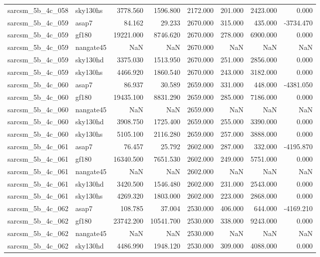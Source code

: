 \begin{tabular}{llrrrrrr}
sarcsm\_5b\_4c\_058 & sky130hs & 3778.560 & 1596.800 & 2172.000 & 201.000 & 2423.000 & 0.000 \\
sarcsm\_5b\_4c\_059 & asap7 & 84.162 & 29.233 & 2670.000 & 315.000 & 435.000 & -3734.470 \\
sarcsm\_5b\_4c\_059 & gf180 & 19221.000 & 8746.620 & 2670.000 & 278.000 & 6900.000 & 0.000 \\
sarcsm\_5b\_4c\_059 & nangate45 & NaN & NaN & 2670.000 & NaN & NaN & NaN \\
sarcsm\_5b\_4c\_059 & sky130hd & 3375.030 & 1513.950 & 2670.000 & 251.000 & 2856.000 & 0.000 \\
sarcsm\_5b\_4c\_059 & sky130hs & 4466.920 & 1860.540 & 2670.000 & 243.000 & 3182.000 & 0.000 \\
sarcsm\_5b\_4c\_060 & asap7 & 86.937 & 30.589 & 2659.000 & 331.000 & 448.000 & -4381.050 \\
sarcsm\_5b\_4c\_060 & gf180 & 19435.100 & 8831.290 & 2659.000 & 285.000 & 7186.000 & 0.000 \\
sarcsm\_5b\_4c\_060 & nangate45 & NaN & NaN & 2659.000 & NaN & NaN & NaN \\
sarcsm\_5b\_4c\_060 & sky130hd & 3908.750 & 1725.400 & 2659.000 & 255.000 & 3390.000 & 0.000 \\
sarcsm\_5b\_4c\_060 & sky130hs & 5105.100 & 2116.280 & 2659.000 & 257.000 & 3888.000 & 0.000 \\
sarcsm\_5b\_4c\_061 & asap7 & 76.457 & 25.792 & 2602.000 & 287.000 & 332.000 & -4195.870 \\
sarcsm\_5b\_4c\_061 & gf180 & 16340.500 & 7651.530 & 2602.000 & 249.000 & 5751.000 & 0.000 \\
sarcsm\_5b\_4c\_061 & nangate45 & NaN & NaN & 2602.000 & NaN & NaN & NaN \\
sarcsm\_5b\_4c\_061 & sky130hd & 3420.500 & 1546.480 & 2602.000 & 231.000 & 2543.000 & 0.000 \\
sarcsm\_5b\_4c\_061 & sky130hs & 4269.320 & 1803.000 & 2602.000 & 223.000 & 2868.000 & 0.000 \\
sarcsm\_5b\_4c\_062 & asap7 & 108.785 & 37.004 & 2530.000 & 406.000 & 644.000 & -4169.210 \\
sarcsm\_5b\_4c\_062 & gf180 & 23742.200 & 10541.700 & 2530.000 & 338.000 & 9243.000 & 0.000 \\
sarcsm\_5b\_4c\_062 & nangate45 & NaN & NaN & 2530.000 & NaN & NaN & NaN \\
sarcsm\_5b\_4c\_062 & sky130hd & 4486.990 & 1948.120 & 2530.000 & 309.000 & 4088.000 & 0.000 \\

\end{tabular}

